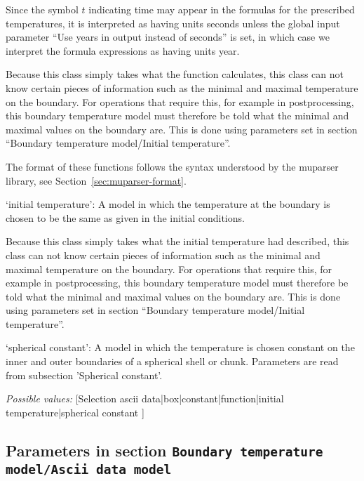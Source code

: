 \begin{itemize}
Since the symbol $t$ indicating time may appear in the formulas for the prescribed temperatures, it is interpreted as having units seconds unless the global input parameter ``Use years in output instead of seconds'' is set, in which case we interpret the formula expressions as having units year.

Because this class simply takes what the function calculates, this class can not know certain pieces of information such as the minimal and maximal temperature on the boundary. For operations that require this, for example in postprocessing, this boundary temperature model must therefore be told what the minimal and maximal values on the boundary are. This is done using parameters set in section ``Boundary temperature model/Initial temperature''.

The format of these functions follows the syntax understood by the muparser library, see Section~\ref{sec:muparser-format}.

`initial temperature': A model in which the temperature at the boundary is chosen to be the same as given in the initial conditions.

Because this class simply takes what the initial temperature had described, this class can not know certain pieces of information such as the minimal and maximal temperature on the boundary. For operations that require this, for example in postprocessing, this boundary temperature model must therefore be told what the minimal and maximal values on the boundary are. This is done using parameters set in section ``Boundary temperature model/Initial temperature''.

`spherical constant': A model in which the temperature is chosen constant on the inner and outer boundaries of a spherical shell or chunk. Parameters are read from subsection 'Spherical constant'.


{\it Possible values:} [Selection ascii data|box|constant|function|initial temperature|spherical constant ]
\end{itemize}



\subsection{Parameters in section \tt Boundary temperature model/Ascii data model}
\label{parameters:Boundary_20temperature_20model/Ascii_20data_20model}


